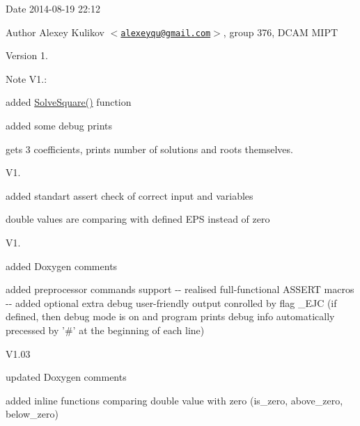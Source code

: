 \begin{DoxyDate}{\-Date}
2014-\/08-\/19 22\-:12 
\end{DoxyDate}
\begin{DoxyAuthor}{\-Author}
\-Alexey \-Kulikov $<$\href{mailto:alexeyqu@gmail.com}{\tt alexeyqu@gmail.\-com}$>$, group 376, \-D\-C\-A\-M \-M\-I\-P\-T 
\end{DoxyAuthor}
\begin{DoxyVersion}{\-Version}
1.
\end{DoxyVersion}
\begin{DoxyNote}{\-Note}
\-V1.\-:
\begin{DoxyItemize}
\item added \hyperlink{Square__Equations_8cpp_ab2dd9b24e0e487efdd1cd1f40dd3a023}{\-Solve\-Square()} function
\item added some debug prints
\item gets 3 coefficients, prints number of solutions and roots themselves.
\end{DoxyItemize}

\-V1.
\begin{DoxyItemize}
\item added standart assert check of correct input and variables
\item double values are comparing with defined \-E\-P\-S instead of zero
\end{DoxyItemize}

\-V1.
\begin{DoxyItemize}
\item added \-Doxygen comments
\item added preprocessor commands support -\/-\/ realised full-\/functional \-A\-S\-S\-E\-R\-T macros -\/-\/ added optional extra debug user-\/friendly output conrolled by flag \-\_\-\-E\-J\-C (if defined, then debug mode is on and program prints debug info automatically precessed by '\#' at the beginning of each line)
\end{DoxyItemize}
\end{DoxyNote}
\begin{DoxyParagraph}{\-V1.03}

\begin{DoxyItemize}
\item updated \-Doxygen comments
\item added inline functions comparing double value with zero (is\-\_\-zero, above\-\_\-zero, below\-\_\-zero)
\end{DoxyItemize}
\end{DoxyParagraph}
